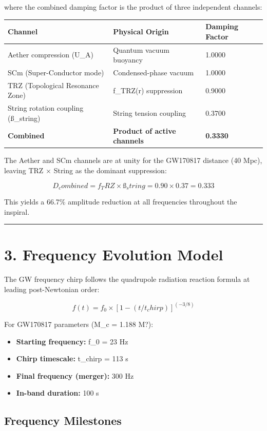 \documentclass[11pt]{article}
\begin{document}
where the combined damping factor is the product of three independent channels:

\begin{center}
\begin{longtable}{lll}
\toprule
Channel & Physical Origin & Damping Factor \tabularnewline
\midrule
\endhead
Aether compression (U\_A) & Quantum vacuum buoyancy & 1.0000 \tabularnewline
SCm (Super-Conductor mode) & Condensed-phase vacuum & 1.0000 \tabularnewline
TRZ (Topological Resonance Zone) & f\_TRZ(r) suppression & 0.9000 \tabularnewline
String rotation coupling (ß\_string) & String tension coupling & 0.3700 \tabularnewline
\textbf{Combined} & \textbf{Product of active channels} & \textbf{0.3330} \tabularnewline
\bottomrule
\end{longtable}
\end{center}

The Aether and SCm channels are at unity for the GW170817 distance (40 Mpc), leaving TRZ $\times$ String as the dominant suppression:

$$
D_combined = f_TRZ \times ß_string = 0.90 \times 0.37 = 0.333
$$

This yields a 66.7\% amplitude reduction at all frequencies throughout the inspiral.

\noindent\rule{\textwidth}{0.4pt}

\section*{3. Frequency Evolution Model}

The GW frequency chirp follows the quadrupole radiation reaction formula at leading post-Newtonian order:

$$
f(t) = f_0 \times [1 - (t/t_chirp)]^(-3/8)
$$

For GW170817 parameters (M\_c = 1.188 M?):

\begin{itemize}
  \item \textbf{Starting frequency:} f\_0 = 23 Hz
  \item \textbf{Chirp timescale:} t\_chirp = 113 s
  \item \textbf{Final frequency (merger):} 300 Hz
  \item \textbf{In-band duration:} 100 s
\end{itemize}

\subsection*{Frequency Milestones}
\end{document}
